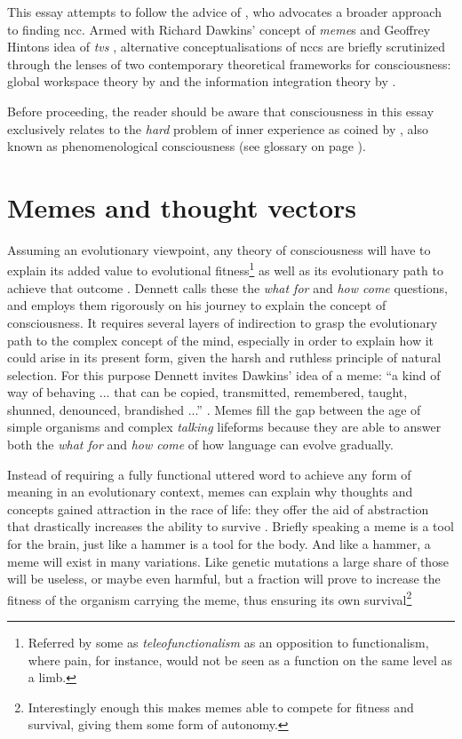 \documentclass[a4paper,oneside]{memoir}
\begin{document}
This essay attempts to follow the advice of \textcite{Hohwy2009}, who advocates
a broader approach to finding \gls{ncc}. Armed with Richard Dawkins' concept of
\textit{\gls{meme}}s \autocite{dennett2017}
and Geoffrey Hintons idea of \textit{\gls{tv}s} \autocite{goh2017}, alternative
conceptualisations of \gls{ncc}s are briefly scrutinized through the lenses of two
contemporary theoretical frameworks for consciousness: global workspace theory by
\textcite{baars2005} and the information integration theory by \textcite{Tononi2004}.

Before proceeding, the reader should be aware that
consciousness in this essay exclusively relates to the \textit{hard} problem of inner experience as
coined by \cite{chalmers1995}, also known as phenomenological consciousness (see glossary on page \pageref{glos}).

\section{Memes and thought vectors}
Assuming an evolutionary viewpoint, any theory of consciousness will have to explain
its added value to evolutional fitness\footnote{Referred by some as \textit{teleofunctionalism} as an opposition to
functionalism, where pain, for instance, would not be seen as a function on the same level
as a limb.} as well as its evolutionary path to achieve that outcome \autocite{dennett2017}. Dennett calls these
the \textit{what for} and \textit{how come} questions, and employs them rigorously on his
journey to explain the concept of consciousness. It requires several layers of indirection to
grasp the evolutionary path to the complex concept of the mind, especially in order to
explain how it could arise in its present form, given the harsh and ruthless principle of natural selection. For this
purpose Dennett invites Dawkins' idea of a \gls{meme}: \enquote{a kind of way of behaving ... that
can be copied, transmitted, remembered, taught, shunned, denounced, brandished ...}
\autocite{dennett2017}. Memes fill the gap between the age of simple organisms and complex
\textit{talking} lifeforms because they are able to answer both the \textit{what for} and
\textit{how come} of how language can evolve gradually.

Instead of requiring a fully functional
uttered word to achieve any form of meaning in an evolutionary context, memes can explain why
thoughts and concepts gained attraction in the race of life: they offer the aid of abstraction
that drastically increases the ability to survive \autocite{dennett2017}. Briefly speaking
a meme is a tool for the brain, just like a hammer is a tool for the body. And like a hammer,
a meme will exist in many variations. Like genetic mutations a large share of those will
be useless, or maybe even harmful, but a fraction will prove to increase the fitness of
the organism carrying the meme, thus ensuring its own survival\footnote{Interestingly
enough this makes memes able to compete for fitness and survival, giving them some form
of autonomy.}
\end{document}
